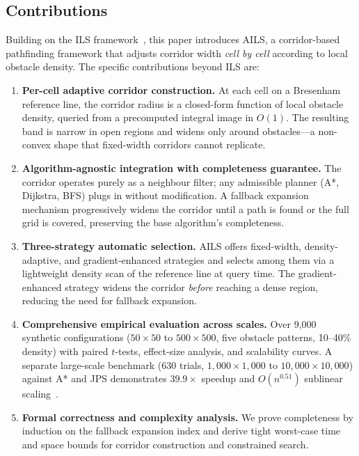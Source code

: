 \documentclass[journal]{IEEEtran}
\begin{document}
\subsection{Contributions}

Building on the ILS framework~\cite{elshahed2025ils}, this paper introduces AILS, a corridor-based pathfinding framework that adjusts corridor width \emph{cell by cell} according to local obstacle density.
The specific contributions beyond ILS are:

\begin{enumerate}
    \item \textbf{Per-cell adaptive corridor construction.}
    At each cell on a Bresenham reference line, the corridor radius is a closed-form function of local obstacle density, queried from a precomputed integral image in $O(1)$.
    The resulting band is narrow in open regions and widens only around obstacles---a non-convex shape that fixed-width corridors cannot replicate.

    \item \textbf{Algorithm-agnostic integration with completeness guarantee.}
    The corridor operates purely as a neighbour filter; any admissible planner (A*, Dijkstra, BFS) plugs in without modification.
    A fallback expansion mechanism progressively widens the corridor until a path is found or the full grid is covered, preserving the base algorithm's completeness.

    \item \textbf{Three-strategy automatic selection.}
    AILS offers fixed-width, density-adaptive, and gradient-enhanced strategies and selects among them via a lightweight density scan of the reference line at query time.
    The gradient-enhanced strategy widens the corridor \emph{before} reaching a dense region, reducing the need for fallback expansion.

    \item \textbf{Comprehensive empirical evaluation across scales.}
    Over 9{,}000 synthetic configurations ($50{\times}50$ to $500{\times}500$, five obstacle patterns, 10--40\% density) with paired $t$-tests, effect-size analysis, and scalability curves.
    A separate large-scale benchmark (630 trials, $1{,}000{\times}1{,}000$ to $10{,}000{\times}10{,}000$) against A* and JPS demonstrates $39.9{\times}$ speedup and $O(n^{0.51})$ sublinear scaling~\cite{lee2025mcpp,huang2024corridor}.

    \item \textbf{Formal correctness and complexity analysis.}
    We prove completeness by induction on the fallback expansion index and derive tight worst-case time and space bounds for corridor construction and constrained search.
\end{enumerate}
\end{document}

